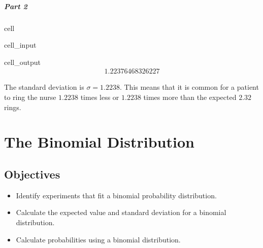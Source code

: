 \documentclass[letterpaper,10pt,english]{jupyterBook}
\begin{document}
\subparagraph{Part 2}
\label{\detokenize{Ch3 Probability/3.5 Discrete Probability Distributions:id10}}
\begin{sphinxuseclass}{cell}\begin{sphinxVerbatimInput}

\begin{sphinxuseclass}{cell_input}
\begin{sphinxVerbatim}[commandchars=\\\{\}]
\end{sphinxVerbatim}

\end{sphinxuseclass}\end{sphinxVerbatimInput}
\begin{sphinxVerbatimOutput}

\begin{sphinxuseclass}{cell_output}\begin{equation*}
\begin{split}1.22376468326227\end{split}
\end{equation*}
\end{sphinxuseclass}\end{sphinxVerbatimOutput}

\end{sphinxuseclass}
\sphinxAtStartPar
The standard deviation is \(\sigma = 1.2238\). This means that it is common for a patient to ring the nurse \(1.2238\) times less or \(1.2238\) times more than the expected \(2.32\) rings.

\sphinxstepscope


\section{The Binomial Distribution}
\label{\detokenize{Ch3 Probability/3.6 The Binomial Distribution:the-binomial-distribution}}\label{\detokenize{Ch3 Probability/3.6 The Binomial Distribution::doc}}

\subsection{Objectives}
\label{\detokenize{Ch3 Probability/3.6 The Binomial Distribution:objectives}}\begin{itemize}
\item {} 
\sphinxAtStartPar
Identify experiments that fit a binomial probability distribution.

\item {} 
\sphinxAtStartPar
Calculate the expected value and standard deviation for a binomial distribution.

\item {} 
\sphinxAtStartPar
Calculate probabilities using a binomial distribution.

\end{itemize}
\end{document}
